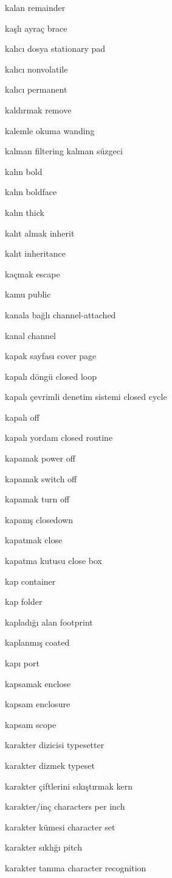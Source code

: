\documentclass[12pt,fleqn]{article}\usepackage{../../common}
\begin{document}
kalan remainder

kaşlı ayraç brace

kalıcı dosya stationary pad

kalıcı nonvolatile

kalıcı permanent

kaldırmak remove

kalemle okuma wanding

kalman filtering kalman süzgeci

kalın bold

kalın boldface

kalın thick

kalıt almak inherit

kalıt inheritance

kaçmak escape

kamu public

kanala bağlı channel-attached

kanal channel

kapak sayfası cover page

kapalı döngü closed loop

kapalı çevrimli denetim sistemi closed cycle

kapalı off

kapalı yordam closed routine

kapamak power off

kapamak switch off

kapamak turn off

kapanış closedown

kapatmak close

kapatma kutusu close box

kap container

kap folder

kapladığı alan footprint

kaplanmış coated

kapı port

kapsamak enclose

kapsam enclosure

kapsam scope

karakter dizicisi typesetter

karakter dizmek typeset

karakter çiftlerini sıkıştırmak kern

karakter/inç characters per inch

karakter kümesi character set

karakter sıklığı pitch

karakter tanıma character recognition
\end{document}
